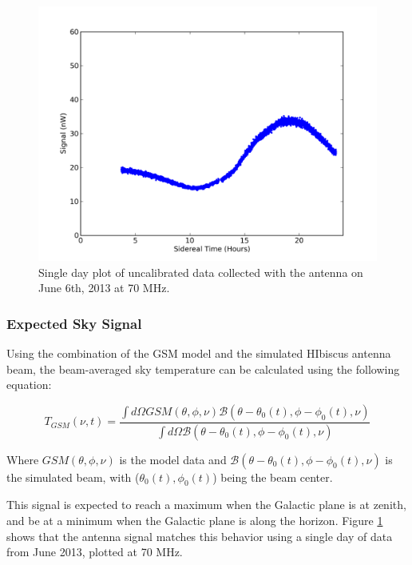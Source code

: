 \begin{figure}[htb]
\begin{center}
\includegraphics[width=0.9\linewidth]{Data_analysis/figures/June_06_time_series_uncal_70mhz.png}
\caption{Single day plot of uncalibrated data collected with the antenna on June 6th, 2013 at 70 MHz.}
\label{Fig:raw_time_series}
\end{center}
\end{figure}

\subsubsection{Expected Sky Signal}

Using the combination of the GSM model and the simulated HIbiscus antenna beam, the beam-averaged sky temperature can be calculated using the following equation: 

\begin{equation}
T_{GSM} (\nu,t) = \frac{ \int d \Omega GSM (\theta, \phi, \nu) \mathcal{B} (\theta - \theta_0(t), \phi - \phi_0(t),\nu)}{\int d\Omega \mathcal{B} (\theta -\theta_0(t), \phi - \phi_0(t), \nu)}
\end{equation}

Where $GSM (\theta, \phi, \nu)$ is the model data and $\mathcal{B} (\theta - \theta_0(t), \phi - \phi_0(t),\nu)$ is the simulated beam, with ($\theta_0 (t),\phi_0 (t)$) being the beam center. 

This signal is expected to reach a maximum when the Galactic plane is at zenith, and be at a minimum when the Galactic plane is along the horizon. Figure \ref{Fig:raw_time_series} shows that the antenna signal matches this behavior using a single day of data from June 2013, plotted at 70 MHz. 


